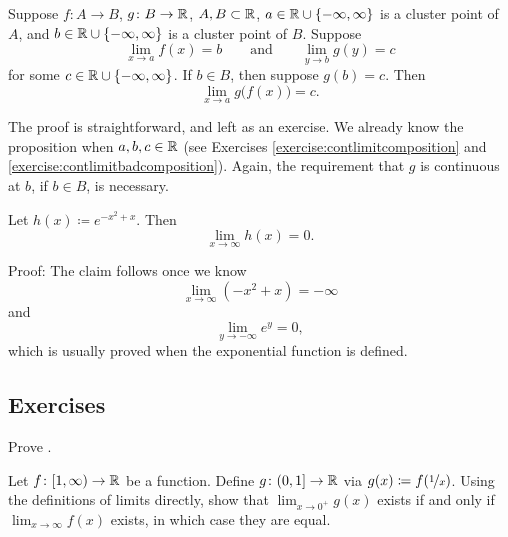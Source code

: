 \begin{prop} \label{prop:inflimcompositions}
Suppose $f \colon A \to B$, $g \colon B \to {\mathbb{R}}$, $A, B \subset {\mathbb{R}}$, 
$a \in {\mathbb{R}} \cup \{ -\infty, \infty\}$ is a cluster point of $A$,
and $b \in {\mathbb{R}} \cup \{ -\infty, \infty\}$ is a cluster point of $B$.
Suppose 
\begin{equation*}
\lim_{x \to a} f(x) = b\qquad \text{and} \qquad \lim_{y \to b} g(y) = c
\end{equation*}
for some $c \in {\mathbb{R}} \cup \{ -\infty, \infty \}$.
If $b \in B$, then suppose $g(b) = c$.
Then
\begin{equation*}
\lim_{x \to a} g\bigl(f(x)\bigr) = c .
\end{equation*}
\end{prop}

The proof is straightforward, and left as an exercise.  We already
know the proposition when $a, b, c \in {\mathbb{R}}$ (see Exercises
\ref{exercise:contlimitcomposition} and
\ref{exercise:contlimitbadcomposition}).  Again, the requirement that $g$ is
continuous at $b$, if $b \in B$, is necessary.

\begin{example}
Let $h(x) \coloneqq e^{-x^2+x}$.  Then
\begin{equation*}
\lim_{x\to \infty} h(x) = 0 .
\end{equation*}

Proof:
The claim follows once we know
\begin{equation*}
\lim_{x\to \infty} (-x^2+x) = -\infty
\end{equation*}
and
\begin{equation*}
\lim_{y\to -\infty} e^y = 0 ,
\end{equation*}
which is usually proved when the exponential function is defined.
\end{example}

\subsection{Exercises}

\begin{exercise}
Prove .
\end{exercise}

\begin{exercise}
Let $f \colon [1,\infty) \to {\mathbb{R}}$ be a function.  Define
$g \colon (0,1] \to {\mathbb{R}}$ via $g(x) \coloneqq f(\nicefrac{1}{x})$.
Using the definitions of limits directly,
show that $\lim_{x\to 0^+} g(x)$
exists if and only if $\lim_{x\to \infty} f(x)$ exists, in which
case they are equal.
\end{exercise}

